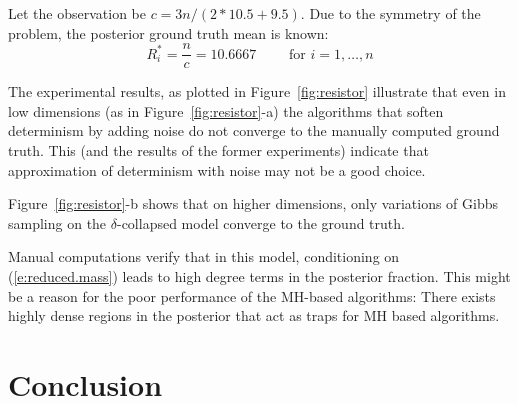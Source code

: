 \documentclass[]{article}
\begin{document}
Let the observation be $c = {3n}/{(2*10.5 + 9.5)}$.
Due to the symmetry of the problem, the posterior ground truth mean is known:
\begin{equation*}
R_i^* = \frac{n}{c} = 10.6667\qquad \text{ for } i = 1, \ldots, n
\end{equation*}

The experimental results, as plotted in Figure~\ref{fig:resistor} illustrate that even 
in low dimensions (as in Figure~\ref{fig:resistor}-a) the algorithms that soften determinism by adding noise do not converge to the manually computed ground truth. This (and the results of the former experiments) indicate that approximation of determinism with noise may not be a good choice.

Figure~\ref{fig:resistor}-b shows that on higher dimensions, only variations of Gibbs sampling on the $\delta$-collapsed model converge to the ground truth.%


Manual computations verify that in this model, 
conditioning on 
(\ref{e:reduced.mass}) leads to high degree terms in the posterior fraction.
This might be a reason for the poor performance of the MH-based algorithms:
There exists highly dense regions in the posterior that act as traps for MH based algorithms.


 \section{Conclusion}
\label{sect:conclusion}
\end{document}

